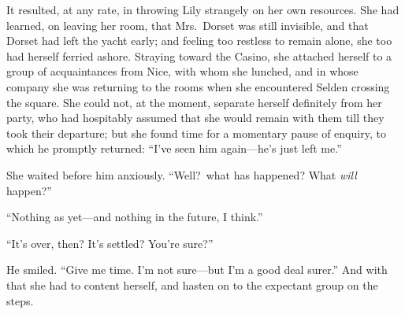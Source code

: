 \documentclass[12pt,a4paper]{book}
\begin{document}
It resulted, at any rate, in throwing Lily strangely on her own
resources. She had learned, on leaving her room, that Mrs.\ Dorset
was still invisible, and that Dorset had left the yacht early;
and feeling too restless to remain alone, she too had herself
ferried ashore. Straying toward the Casino, she attached herself
to a group of acquaintances from Nice, with whom she lunched, and
in whose company she was returning to the rooms when she
encountered Selden crossing the square. She could not, at the
moment, separate herself definitely from her party, who had
hospitably assumed that she would remain with them till they took
their departure; but she found time for a momentary pause of
enquiry, to which he promptly returned: ``I've seen him
again---he's just left me.''





She waited before him anxiously. ``Well?\ what has happened? What
\textit{will} happen?''





``Nothing as yet---and nothing in the future, I think.''





``It's over, then? It's settled? You're sure?''





He smiled. ``Give me time. I'm not sure---but I'm a good deal
surer.'' And with that she had to content herself, and hasten on
to the expectant group on the steps.
\end{document}
